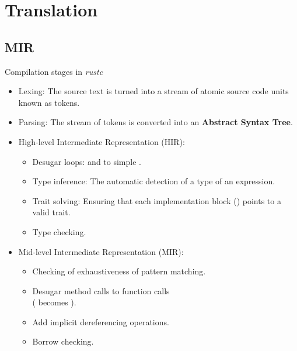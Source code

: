 \documentclass{beamer}
\begin{document}
\section{Translation}

\subsection{MIR}

\begin{frame}{Compilation stages in \emph{rustc}}
  \scriptsize

  \begin{itemize}
    \item Lexing: The source text is turned into a stream of atomic source code units known as tokens.
          \pause
    \item Parsing: The stream of tokens is converted into an \textbf{Abstract Syntax Tree}.
          \pause
    \item High-level Intermediate Representation (HIR):
          \begin{itemize}
            \scriptsize
            [circle]
            \item Desugar loops:  and  to simple .
            \item Type inference: The automatic detection of a type of an expression.
            \item Trait solving: Ensuring that each implementation block () points to a valid trait.
            \item Type checking.
          \end{itemize}
          \pause
    \item Mid-level Intermediate Representation (MIR):
          \begin{itemize}
            \scriptsize
            [circle]
            \item Checking of exhaustiveness of pattern matching.
            \item Desugar method calls to function calls\\
                  ( becomes ).
            \item Add implicit dereferencing operations.
            \item Borrow checking.

\end{itemize}
\end{itemize}
\end{frame}
\end{document}
